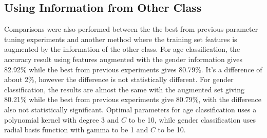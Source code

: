 \documentclass[a4paper]{llncs}
\begin{document}
\subsection{Using Information from Other Class}
Comparisons were also performed between the the best from previous parameter tuning experiments and another method where the training set features is augmented by the information of the other class. For age classification, the accuracy result using features augmented with the gender information gives 82.92\% while the best from previous experiments gives 80.79\%. It's a difference of about 2\%, however the difference is not statistically different. For gender classification, the results are almost the same with the augmented set giving 80.21\% while the best from previous experiments give 80.79\%, with the difference also not statistically significant. Optimal parameters for age classification uses a polynomial kernel with degree 3 and $C$ to be 10, while gender classification uses radial basis function with gamma to be 1 and $C$ to be 10.


\end{document}
